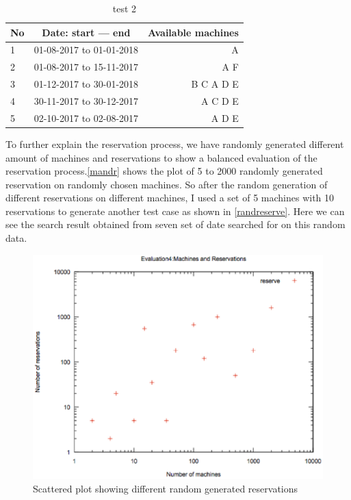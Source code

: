 \begin{table}[h!]
  \centering
  \label{tab:table1}
  \begin{tabular}{l|c||r}
    No & Date: start --- end & Available machines\\
    \hline
    1 &01-08-2017 to 01-01-2018  & A \\
    2 &01-08-2017 to 15-11-2017  & A F\\
    3 &01-12-2017 to 30-01-2018  & B C A D E \\
    4 &30-11-2017 to 30-12-2017  & A  C D E\\
    5 &02-10-2017 to 02-08-2017  & A  D E \\
  \end{tabular}
  \caption{test 2}
\end{table}
\pagebreak
To further explain the reservation process, we have randomly generated different amount of machines and reservations to show a balanced evaluation of the reservation process.\autoref{mandr} shows the plot of 5 to 2000 randomly generated reservation on randomly chosen machines. So after the random generation of different reservations on different machines, I used a set of 5 machines with 10 reservations to generate another test case as shown in \autoref{randreserve}. Here we can see the search result obtained from seven set of date searched for on this random data.
\begin{figure}
\includegraphics[width=\linewidth]{mandr.eps}
\caption{Scattered plot showing different random generated reservations}
\label{mandr}
\end{figure}

